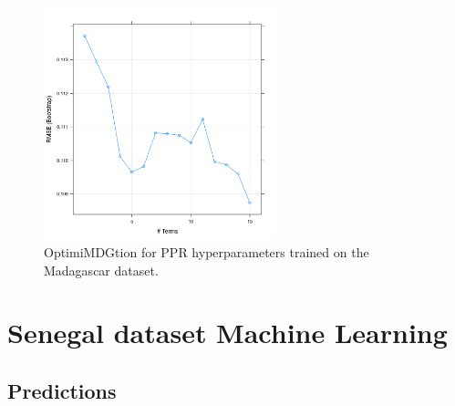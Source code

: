 \documentclass[review]{elsarticle}
\begin{document}
\begin{figure}[h!]
  \centering
  \includegraphics[width=0.6\textwidth]{figs/SI/ppropt_mdg.png}
\caption{
  OptimiMDGtion for PPR hyperparameters trained on the Madagascar dataset.
}

\end{figure}








\clearpage
\section{Senegal dataset Machine Learning}






\subsection{Predictions}
\end{document}
